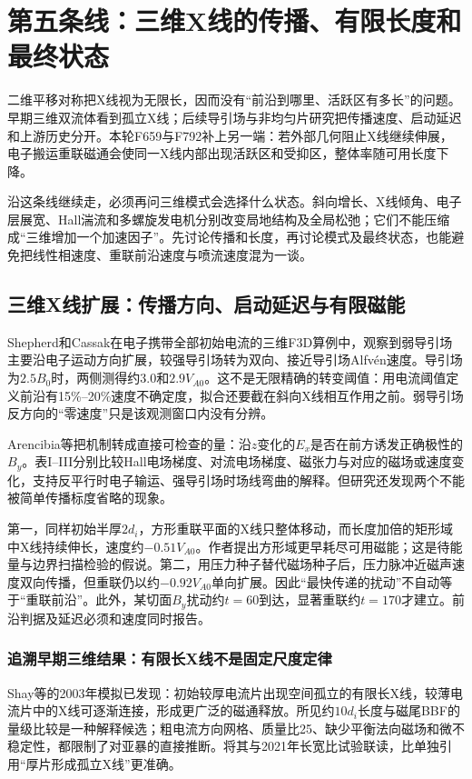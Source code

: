 \section{第五条线：三维X线的传播、有限长度和最终状态}\label{story:three}
二维平移对称把X线视为无限长，因而没有“前沿到哪里、活跃区有多长”的问题。早期三维双流体看到孤立X线；后续导引场与非均匀片研究把传播速度、启动延迟和上游历史分开。本轮F659与F792补上另一端：若外部几何阻止X线继续伸展，电子搬运重联磁通会使同一X线内部出现活跃区和受抑区，整体率随可用长度下降。

沿这条线继续走，必须再问三维模式会选择什么状态。斜向增长、X线倾角、电子层展宽、Hall湍流和多螺旋发电机分别改变局地结构及全局松弛；它们不能压缩成“三维增加一个加速因子”。先讨论传播和长度，再讨论模式及最终状态，也能避免把线性相速度、重联前沿速度与喷流速度混为一谈。

\subsection{三维X线扩展：传播方向、启动延迟与有限磁能}
Shepherd和Cassak在电子携带全部初始电流的三维F3D算例中，观察到弱导引场主要沿电子运动方向扩展，较强导引场转为双向、接近导引场Alfvén速度。导引场为$2.5B_0$时，两侧测得约$3.0$和$2.9V_{\!A0}$。这不是无限精确的转变阈值：用电流阈值定义前沿有15\%--20\%速度不确定度，拟合还要截在斜向X线相互作用之前。弱导引场反方向的“零速度”只是该观测窗口内没有分辨。\citep{Shepherd2012}

Arencibia等把机制转成直接可检查的量：沿$z$变化的$E_x$是否在前方诱发正确极性的$B_y$。表I--III分别比较Hall电场梯度、对流电场梯度、磁张力与对应的磁场或速度变化，支持反平行时电子输运、强导引场时场线弯曲的解释。但研究还发现两个不能被简单传播标度省略的现象。\citep{L275}

第一，同样初始半厚$2d_i$，方形重联平面的X线只整体移动，而长度加倍的矩形域中X线持续伸长，速度约$-0.51V_{\!A0}$。作者提出方形域更早耗尽可用磁能；这是待能量与边界扫描检验的假说。第二，用压力种子替代磁场种子后，压力脉冲近磁声速度双向传播，但重联仍以约$-0.92V_{\!A0}$单向扩展。因此“最快传递的扰动”不自动等于“重联前沿”。此外，某切面$B_y$扰动约$t=60$到达，显著重联约$t=170$才建立。前沿判据及延迟必须和速度同时报告。

\subsubsection{追溯早期三维结果：有限长X线不是固定尺度定律}
Shay等的2003年模拟已发现：初始较厚电流片出现空间孤立的有限长X线，较薄电流片中的X线可逐渐连接，形成更广泛的磁通释放。所见约$10d_i$长度与磁尾BBF的量级比较是一种解释候选；粗电流方向网格、质量比25、缺少平衡法向磁场和微不稳定性，都限制了对亚暴的直接推断。将其与2021年长宽比试验联读，比单独引用“厚片形成孤立X线”更准确。\citep{Shay2003,L275}

